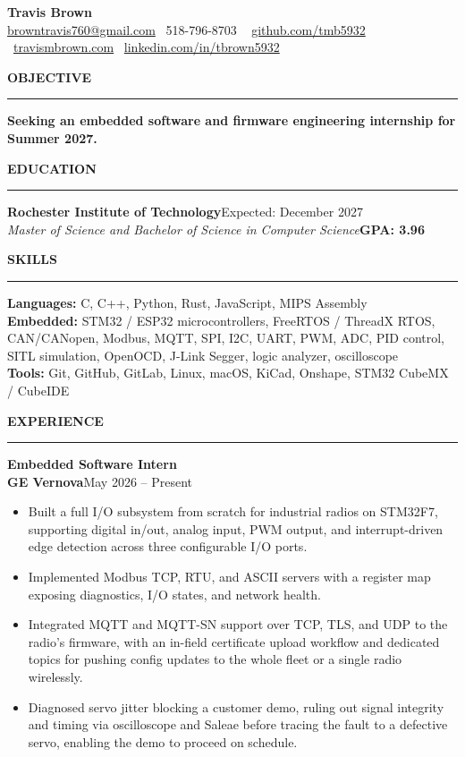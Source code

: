 \documentclass[10pt]{article}
\newcommand{\resumesection}[1]{%
  \vspace{5pt}%
  \noindent\textbf{#1}\\[-8pt]%
  \noindent\rule{\linewidth}{0.5pt}%
  \vspace{1pt}%
}
\newcommand{\entry}[3]{%
  \noindent\textbf{#1}\\%
  \noindent\textbf{#2}\hfill#3%
}
\begin{document}
\begin{center}
  {\LARGE\textbf{Travis Brown}}\\[2pt]
  \href{mailto:browntravis760@gmail.com}{browntravis760@gmail.com} \textbullet\
  518-796-8703 \textbullet\
  \href{https://github.com/tmb5932}{github.com/tmb5932} \textbullet\
  \href{https://www.travismbrown.com}{travismbrown.com} \textbullet\
  \href{https://www.linkedin.com/in/tbrown5932}{linkedin.com/in/tbrown5932}
\end{center}

\resumesection{OBJECTIVE}
\textbf{Seeking an embedded software and firmware engineering internship for Summer 2027.}

\resumesection{EDUCATION}
\noindent\textbf{Rochester Institute of Technology}\hfill Expected: December 2027\\
\textit{Master of Science and Bachelor of Science in Computer Science}\hfill\textbf{GPA: 3.96}

\resumesection{SKILLS}
\noindent\textbf{Languages:} C, C++, Python, Rust, JavaScript, MIPS Assembly\\[3pt]
\noindent\textbf{Embedded:} STM32 / ESP32 microcontrollers, FreeRTOS / ThreadX RTOS, CAN/CANopen, Modbus, MQTT, SPI, I2C, UART, PWM, ADC, PID control, SITL simulation, OpenOCD, J-Link Segger, logic analyzer, oscilloscope\\[3pt]
\noindent\textbf{Tools:} Git, GitHub, GitLab, Linux, macOS, KiCad, Onshape, STM32 CubeMX / CubeIDE

\resumesection{EXPERIENCE}

\entry{Embedded Software Intern}{GE Vernova}{May 2026 – Present}
\begin{itemize}
  \item Built a full I/O subsystem from scratch for industrial radios on STM32F7, supporting digital in/out, analog input, PWM output, and interrupt-driven edge detection across three configurable I/O ports.
  \item Implemented Modbus TCP, RTU, and ASCII servers with a register map exposing diagnostics, I/O states, and network health.
  \item Integrated MQTT and MQTT-SN support over TCP, TLS, and UDP to the radio's firmware, with an in-field certificate upload workflow and dedicated topics for pushing config updates to the whole fleet or a single radio wirelessly.
  \item Diagnosed servo jitter blocking a customer demo, ruling out signal integrity and timing via oscilloscope and Saleae before tracing the fault to a defective servo, enabling the demo to proceed on schedule.
\end{itemize}
\end{document}
